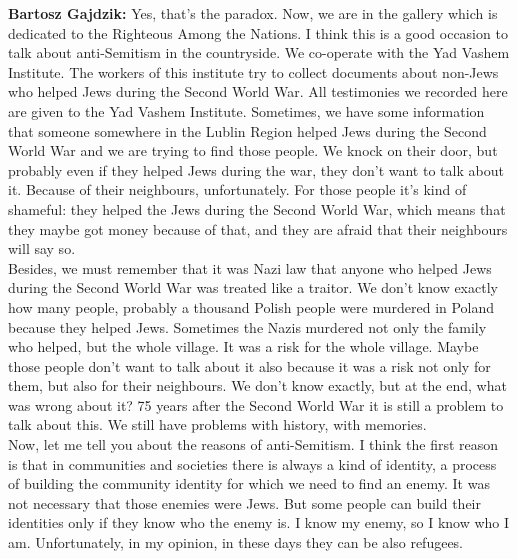 \textbf{Bartosz Gajdzik:} Yes, that’s the paradox. Now, we are in the gallery which is dedicated to the Righteous Among the Nations. I think this is a good occasion to talk about anti-Semitism in the countryside. We co-operate with the Yad Vashem Institute. The workers of this institute try to collect documents about non-Jews who helped Jews during the Second World War. All testimonies we recorded here are given to the Yad Vashem Institute. Sometimes, we have some information that someone somewhere in the Lublin Region helped Jews during the Second World War and we are trying to find those people. We knock on their door, but probably even if they helped Jews during the war, they don’t want to talk about it. Because of their neighbours, unfortunately. For those people it’s kind of shameful: they helped the Jews during the Second World War, which means that they maybe got money because of that, and they are afraid that their neighbours will say so.\\ 
Besides, we must remember that it was Nazi law that anyone who helped Jews during the Second World War was treated like a traitor. We don’t know exactly how many people, probably a thousand Polish people were murdered in Poland because they helped Jews. Sometimes the Nazis murdered not only the family who helped, but the whole village. It was a risk for the whole village. Maybe those people don’t want to talk about it also because it was a risk not only for them, but also for their neighbours. We don’t know exactly, but at the end, what was wrong about it? 75 years after the Second World War it is still a problem to talk about this. We still have problems with history, with memories.\\  
Now, let me tell you about the reasons of anti-Semitism. I think the first reason is that in communities and societies there is always a kind of identity, a process of building the community identity for which we need to find an enemy. It was not necessary that those enemies were Jews. But some people can build their identities only if they know who the enemy is. I know my enemy, so I know who I am. Unfortunately, in my opinion, in these days they can be also refugees.\\ 
